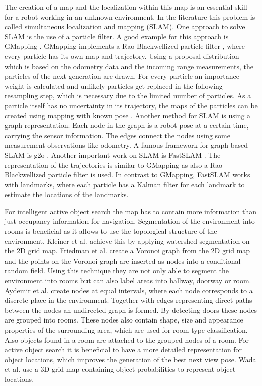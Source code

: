 The creation of a map and the localization within this map is an essential skill for a robot working in an unknown environment. In the literature this problem is called simultaneous localization and mapping (SLAM). One approach to solve SLAM is the use of a particle filter. A good example for this approach is GMapping \cite{GMapping}. GMapping implements a Rao-Blackwellized particle filter \cite{particle}, where every particle has its own map and trajectory. Using a proposal distribution which is based on the odometry data and the incoming range measurements, the particles of the next generation are drawn. For every particle an importance weight is calculated and unlikely particles get replaced in the following resampling step, which is necessary due to the limited number of particles. As a particle itself has no uncertainty in its trajectory, the maps of the particles can be created using mapping with known pose \cite{mapKnownPose}. Another method for SLAM is using a graph representation. Each node in the graph is a robot pose at a certain time, carrying the sensor information. The edges connect the nodes using some measurement observations like odometry. A famous framework for graph-based SLAM is g2o \cite{g2o}. Another important work on SLAM is FastSLAM \cite{fastslam}\cite{fastslam2}. The representation of the trajectories is similar to GMapping as also a Rao-Blackwellized particle filter is used. In contrast to GMapping, FastSLAM works with landmarks, where each particle has a Kalman filter for each landmark to estimate the locations of the landmarks. 

For intelligent active object search the map has to contain more information than just occupancy information for navigation. Segmentation of the environment into rooms is beneficial as it allows to use the topological structure of the environment. Kleiner et al. \cite{seg2} achieve this by applying watershed segmentation on the 2D grid map. Friedman et al. \cite{seg1} create a Voronoi graph from the 2D grid map and the points on the Voronoi graph are inserted as nodes into a conditional random field. Using this technique they are not only able to segment the environment into rooms but can also label areas into hallway, doorway or room. Aydemir et al. \cite{main} create nodes at equal intervals, where each node corresponds to a discrete place in the environment. Together with edges representing direct paths between the nodes an undirected graph is formed. By detecting doors these nodes are grouped into rooms. These nodes also contain shape, size and appearance properties of the surrounding area, which are used for room type classification. Also objects found in a room are attached to the grouped nodes of a room. For active object search it is beneficial to have a more detailed representation for object locations, which improves the generation of the best next view pose. Wada et al. \cite{objMap} use a 3D grid map containing object probabilities to represent object locations.

